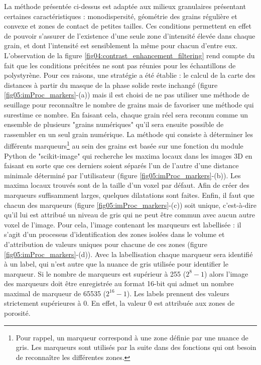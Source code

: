 		La méthode présentée ci-dessus est adaptée aux milieux granulaires présentant certaines caractéristiques : monodispersité, géométrie des grains régulière et convexe et zones de contact de petites tailles. Ces conditions permettent en effet de pouvoir s'assurer de l'existence d'une seule zone d'intensité élevée dans chaque grain, et dont l'intensité est sensiblement la même pour chacun d'entre eux. L'observation de la figure \ref{fig04:contrast_enhancement_filtering} rend compte du fait que les conditions précitées ne sont pas réunies pour les échantillons de polystyrène. Pour ces raisons, une stratégie a été établie : le calcul de la carte des distances à partir du masque de la phase solide reste inchangé (figure \ref{fig05:imProc_markers}-(a)) mais il est choisi de ne pas utiliser une méthode de seuillage pour reconnaître le nombre de grains mais de favoriser une méthode qui surestime ce nombre. En faisant cela, chaque grain réel sera reconnu comme un ensemble de plusieurs "grains numériques" qu'il sera ensuite possible de rassembler en un seul grain numérique. La méthode qui consiste à déterminer les différents marqueurs\footnote{Pour rappel, un marqueur correspond à une zone définie par une nuance de gris. Les marqueurs sont utilisés par la suite dans des fonctions qui ont besoin de reconnaître les différentes zones.} au sein des grains est basée sur une fonction du module Python de "scikit-image" \citep{scikit_image} qui recherche les maxima locaux dans les images 3D en faisant en sorte que ces derniers soient séparés l'un de l'autre d'une distance minimale déterminé par l'utilisateur (figure \ref{fig05:imProc_markers}-(b)). Les maxima locaux trouvés sont de la taille d'un voxel par défaut. Afin de créer des marqueurs suffisamment larges, quelques dilatations sont faites. Enfin, il faut que chacun des marqueurs (figure \ref{fig05:imProc_markers}-(c)) soit unique, c'est-à-dire qu'il lui est attribué un niveau de gris qui ne peut être commun avec aucun autre voxel de l'image. Pour cela, l'image contenant les marqueurs est labellisée : il s'agit d'un processus d'identification des zones isolées dans le volume et d'attribution de valeurs uniques pour chacune de ces zones (figure \ref{fig05:imProc_markers}-(d)). Avec la labellisation chaque marqueur sera identifié à un label, qui n'est autre que la nuance de gris utilisée pour identifier le marqueur. Si le nombre de marqueurs est supérieur à \num{255} ($2^8-1$) alors l'image des marqueurs doit être enregistrée au format 16-bit qui admet un nombre maximal de marqueur de \num{65535} ($2^{16}-1$). Les labels prennent des valeurs strictement supérieures à \num{0}. En effet, la valeur \num{0} est attribuée aux zones de porosité.
